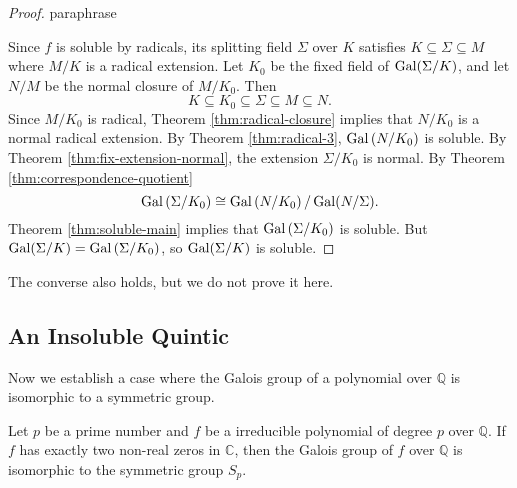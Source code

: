 \begin{proof}
\TODO paraphrase

Since $f$ is soluble by radicals, its splitting field $\Sigma$ over $K$ satisfies $K \subseteq \Sigma \subseteq M$ where $M / K$ is a radical extension. Let $K_0$ be the fixed field of $\operatorname{Gal}(\Sigma / K)$, and let $N / M$ be the normal closure of $M / K_0$. Then
$$
K \subseteq K_0 \subseteq \Sigma \subseteq M \subseteq N.
$$
Since $M / K_0$ is radical, Theorem \ref{thm:radical-closure} implies that $N / K_0$ is a normal radical extension. By Theorem \ref{thm:radical-3}, $\operatorname{Gal}\left(N / K_0\right)$ is soluble.
By Theorem \ref{thm:fix-extension-normal}, the extension $\Sigma / K_0$ is normal. By Theorem \ref{thm:correspondence-quotient}
$$
\operatorname{Gal}\left(\Sigma / K_0\right) \cong \operatorname{Gal}\left(N / K_0\right) / \operatorname{Gal}(N / \Sigma).
$$
Theorem \ref{thm:soluble-main} implies that $\operatorname{Gal}\left(\Sigma / K_0\right)$ is soluble. But $\operatorname{Gal}(\Sigma / K)=\operatorname{Gal}\left(\Sigma / K_0\right)$, so $\operatorname{Gal}(\Sigma / K)$ is soluble.

\end{proof}

The converse also holds, but we do not prove it here.

\subsection{An Insoluble Quintic}

Now we establish a case where the Galois group of a polynomial over $\mathbb Q$ is isomorphic to a symmetric group.

\begin{theorem} \label{thm:galois-iso-symmetric}
    Let $p$ be a prime number and $f$ be a irreducible polynomial of degree $p$ over $\mathbb Q$. If $f$ has exactly two non-real zeros in $\mathbb C$, then the Galois group of $f$ over $\mathbb Q$ is isomorphic to the symmetric group $S_p$.
\end{theorem}

